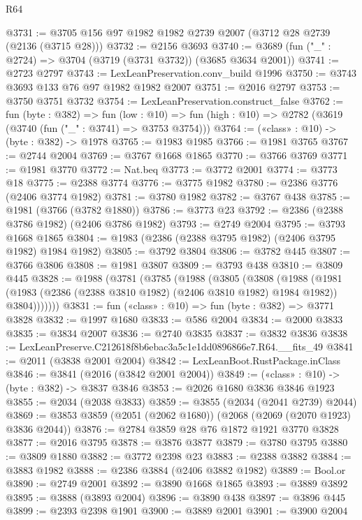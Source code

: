 \begin{lexlean}{R64}
\begin{coremodule}
@3731 := @3705 @156 @97 @1982 @1982 @2739 @2007 (@3712 @28 @2739 (@2136 (@3715 @28)))
@3732 := @2156 @3693
@3740 := @3689 (fun ("_" : @2724) => @3704 (@3719 (@3731 @3732)) (@3685 @3634 @2001))
@3741 := @2723 @2797
@3743 := LexLeanPreservation.conv_build @1996
@3750 := @3743 @3693 @133 @76 @97 @1982 @1982 @2007
@3751 := @2016 @2797
@3753 := @3750 @3751 @3732
@3754 := LexLeanPreservation.construct_false
@3762 := fun (byte : @382) =>
  fun (low : @10) => fun (high : @10) => @2782 (@3619 (@3740 (fun ("_" : @3741) => @3753 @3754)))
@3764 := («class» : @10) -> (byte : @382) -> @1978
@3765 := @1983 @1985
@3766 := @1981 @3765
@3767 := @2744 @2004
@3769 := @3767 @1668 @1865
@3770 := @3766 @3769
@3771 := @1981 @3770
@3772 := Nat.beq
@3773 := @3772 @2001
@3774 := @3773 @18
@3775 := @2388 @3774
@3776 := @3775 @1982
@3780 := @2386 @3776 (@2406 @3774 @1982)
@3781 := @3780 @1982
@3782 := @3767 @438
@3785 := @1981 (@3766 (@3782 @1880))
@3786 := @3773 @23
@3792 := @2386 (@2388 @3786 @1982) (@2406 @3786 @1982)
@3793 := @2749 @2004
@3795 := @3793 @1668 @1865
@3804 := @1983 (@2386 (@2388 @3795 @1982) (@2406 @3795 @1982) @1984 @1982)
@3805 := @3792 @3804
@3806 := @3782 @445
@3807 := @3766 @3806
@3808 := @1981 @3807
@3809 := @3793 @438
@3810 := @3809 @445
@3828 := @1988
    (@3781
      (@3785
        (@1988
          (@3805
            (@3808
              (@1988
                (@1981
                  (@1983 (@2386 (@2388 @3810 @1982) (@2406 @3810 @1982) @1984 @1982))
                  @3804)))))))
@3831 := fun («class» : @10) => fun (byte : @382) => @3771 @3828
@3832 := @1997 @1680
@3833 := @586 @2004
@3834 := @2000 @3833
@3835 := @3834 @2007
@3836 := @2740 @3835
@3837 := @3832 @3836
@3838 := LexLeanPreserve.C212618f8b6ebac3a5c1e1dd0896866e7.R64.__fits_49
@3841 := @2011 (@3838 @2001 @2004)
@3842 := LexLeanBoot.RustPackage.inClass
@3846 := @3841 (@2016 (@3842 @2001 @2004))
@3849 := («class» : @10) -> (byte : @382) -> @3837 @3846
@3853 := @2026 @1680 @3836 @3846 @1923
@3855 := @2034 (@2038 @3833)
@3859 := @3855 (@2034 (@2041 @2739) @2044)
@3869 := @3853 @3859 (@2051 (@2062 @1680)) (@2068 (@2069 (@2070 @1923) @3836 @2044))
@3876 := @2784 @3859 @28 @76 @1872 @1921 @3770 @3828
@3877 := @2016 @3795
@3878 := @3876 @3877
@3879 := @3780 @3795
@3880 := @3809 @1880
@3882 := @3772 @2398 @23
@3883 := @2388 @3882
@3884 := @3883 @1982
@3888 := @2386 @3884 (@2406 @3882 @1982)
@3889 := Bool.or
@3890 := @2749 @2001
@3892 := @3890 @1668 @1865
@3893 := @3889 @3892
@3895 := @3888 (@3893 @2004)
@3896 := @3890 @438
@3897 := @3896 @445
@3899 := @2393 @2398 @1901
@3900 := @3889 @2001
@3901 := @3900 @2004

\end{coremodule}
\end{lexlean}

